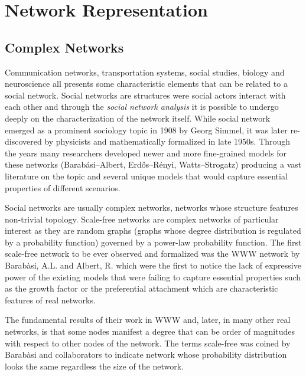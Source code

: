 
	\chapter{Network Representation}

	
	\section{Complex Networks}
	
	Communication networks, transportation systems, social studies, biology and neuroscience all presents some characteristic elements that can be related to a social network. Social networks are structures were social actors interact with each other and through the \textit{social network analysis} it is possible to undergo deeply on the characterization of the network itself. While social network emerged as a prominent sociology topic in 1908 by Georg Simmel, it was later re-discovered by physicists and mathematically formalized in late 1950s. Through the years many researchers developed newer and more fine-grained models for these networks (Barabási–Albert\cite{Barabasi1999}, Erdős–Rényi\cite{Erdos1959}, Watts–Strogatz\cite{Watts1998}) producing a vast literature on the topic and several unique models that would capture essential properties of different scenarios.
	
	Social networks are usually complex networks, networks whose structure features non-trivial topology. Scale-free networks are complex networks of particular interest as they are random graphs (graphs whose degree distribution is regulated by a probability function) governed by a power-law probability function. The first scale-free network to be ever observed and formalized was the WWW network by Barabàsi, A.L. and Albert, R. \cite{Barabasi1999} which were the first to notice the lack of expressive power of the existing models that were failing to capture essential properties such as the growth factor or the preferential attachment which are characteristic features of real networks.
	
	The fundamental results of their work in WWW and, later, in many other real networks, is that some nodes manifest a degree that can be order of magnitudes with respect to other nodes of the network. The terms scale-free was coined by Barabàsi and collaborators to indicate network whose probability distribution looks the same regardless the size of the network. 
	
